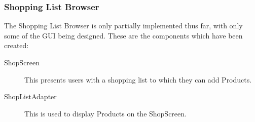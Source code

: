 \subsubsection{Shopping List Browser}
The Shopping List Browser is only partially implemented thus far, with only some of the GUI being designed.
These are the components which have been created:
\begin{description}
\item[ShopScreen] This presents users with a shopping list to which they can add Products.
\item[ShopListAdapter] This is used to display Products on the ShopScreen.
\end{description}
